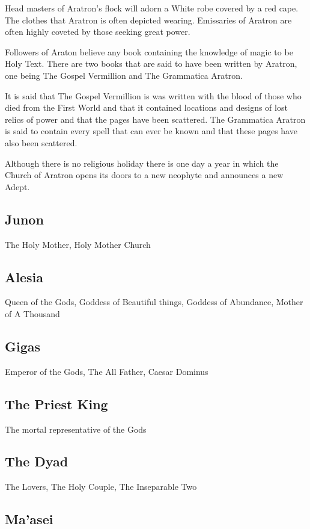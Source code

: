 \begin{multicols}{2}
Head masters of Aratron's flock will adorn a White robe covered by a red cape. The clothes that Aratron is often depicted wearing. Emissaries of Aratron are often highly coveted by those seeking great power.

Followers of Araton believe any book containing the knowledge of magic to be Holy Text. There are two books that are said to have been written by Aratron, one being The Gospel Vermillion and The Grammatica Aratron.

It is said that The Gospel Vermillion is was written with the blood of those who died from the First World and that it contained locations and designs of lost relics of power and that the pages have been scattered. The Grammatica Aratron is said to contain every spell that can ever be known and that these pages have also been scattered.

Although there is no religious holiday there is one day a year in which the Church of Aratron opens its doors to a new neophyte and announces a new Adept.

\subsection{Junon} The Holy Mother, Holy Mother Church

\subsection{Alesia} Queen of the Gods, Goddess of Beautiful things, Goddess of Abundance, Mother of A Thousand

\subsection{Gigas} Emperor of the Gods, The All Father, Caesar Dominus

\subsection{The Priest King} The mortal representative of the Gods

\subsection{The Dyad} The Lovers, The Holy Couple, The Inseparable Two

\subsection{Ma'asei}


\end{multicols}
